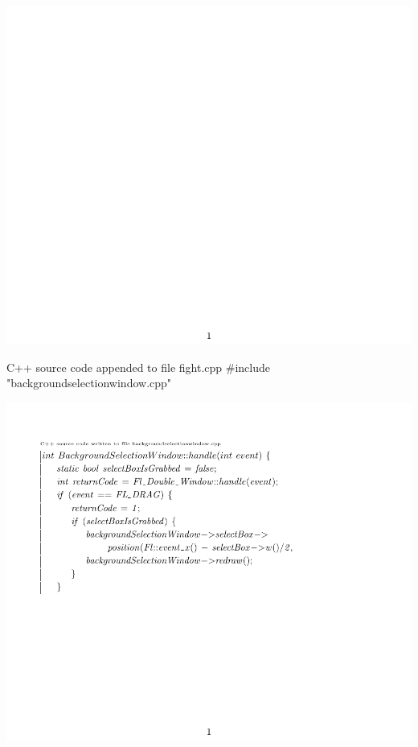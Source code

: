 \documentclass{article}
\begin{document}
\includegraphics[page=7]{Fighter.pdf}
\begin{GFT}{C++ source code appended to file fight.cpp}
\+\#include "backgroundselectionwindow.cpp"\\
\end{GFT}
\includegraphics[page=1]{backgroundselectionwindow.pdf}
\end{document}
